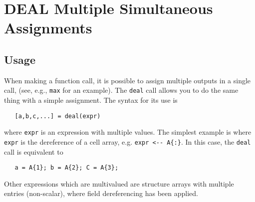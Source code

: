 \section{DEAL Multiple Simultaneous Assignments}

\subsection{Usage}

When making a function call, it is possible to assign
multiple outputs in a single call, (see, e.g., \verb|max| for
an example).  The \verb|deal| call allows you to do the 
same thing with a simple assignment.  The syntax for its
use is
\begin{verbatim}
   [a,b,c,...] = deal(expr)
\end{verbatim}
where \verb|expr| is an expression with multiple values.  The simplest
example is where \verb|expr| is the dereference of a cell array, e.g.
\verb|expr <-- A{:}|.  In this case, the \verb|deal| call is equivalent
to
\begin{verbatim}
   a = A{1}; b = A{2}; C = A{3}; 
\end{verbatim}
Other expressions which are multivalued are structure arrays with
multiple entries (non-scalar), where field dereferencing has been
applied.
